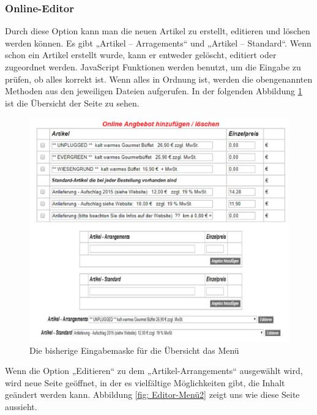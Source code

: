 \subsubsection{Online-Editor}

Durch diese Option kann man die neuen Artikel zu erstellt, editieren und löschen werden können.  Es gibt „Artikel – Arragements“ und „Artikel – Standard“. Wenn schon ein Artikel erstellt wurde, kann er entweder gelöscht, editiert oder zugeordnet werden. 
JavaScript Funktionen werden benutzt, um die Eingabe zu prüfen, ob alles korrekt ist. Wenn alles in Ordnung ist, werden die obengenannten Methoden aus den jeweiligen Dateien aufgerufen. In der folgenden Abbildung \ref{fig: Online-Editor übersicht} ist die Übersicht der Seite zu sehen.
\pagebreak

\begin{figure}[h]
	\centering
	\includegraphics[width=0.7\linewidth]{Graphics/menue-uebesicht.png}
	\caption[Kundeansicht]{Die bisherige Eingabemaske für die Übersicht das Menü}
	\label{fig: Online-Editor übersicht}
\end{figure}

Wenn die Option „Editieren“ zu dem „Artikel-Arrangements“ ausgewählt wird, wird neue Seite geöffnet, in der es vielfältige Möglichkeiten gibt, die Inhalt geändert werden kann. Abbildung \ref{fig: Editor-Menü2}  zeigt uns wie diese Seite aussieht.

